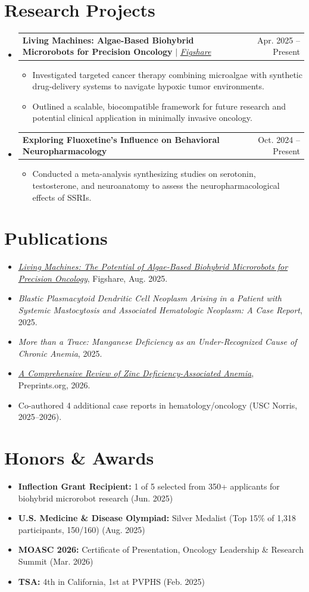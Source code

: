 \documentclass[letterpaper,11pt]{article}
\makeatletter
\newcommand{\resumeItem}[1]{
  \item\small{
    {#1 \vspace{-2pt}}
  }
}
\newcommand{\resumeProjectHeading}[2]{
    \item
    \begin{tabular*}{0.97\textwidth}{l@{\extracolsep{\fill}}r}
      \small#1 & #2 \\
    \end{tabular*}\vspace{-7pt}
}
\newcommand{\resumeSubHeadingListStart}{\begin{itemize}[leftmargin=0.15in, label={}]}
\newcommand{\resumeSubHeadingListEnd}{\end{itemize}}
\newcommand{\resumeItemListStart}{\begin{itemize}}
\newcommand{\resumeItemListEnd}{\end{itemize}\vspace{-5pt}}
\makeatother
\begin{document}
\section{Research Projects}
    \resumeSubHeadingListStart
      \resumeProjectHeading
          {\textbf{Living Machines: Algae-Based Biohybrid Microrobots for Precision Oncology} $|$ \emph{\href{https://figshare.com/articles/preprint/Living_Machines_Algae-Based_Biohybrid_Microrobots_for_Precision_Oncology/29896883}{\underline{Figshare}}}}{Apr. 2025 -- Present}
          \resumeItemListStart
            \resumeItem{Investigated targeted cancer therapy combining microalgae with synthetic drug-delivery systems to navigate hypoxic tumor environments.}
            \resumeItem{Outlined a scalable, biocompatible framework for future research and potential clinical application in minimally invasive oncology.}
          \resumeItemListEnd
      \resumeProjectHeading
          {\textbf{Exploring Fluoxetine's Influence on Behavioral Neuropharmacology}}{Oct. 2024 -- Present}
          \resumeItemListStart
            \resumeItem{Conducted a meta-analysis synthesizing studies on serotonin, testosterone, and neuroanatomy to assess the neuropharmacological effects of SSRIs.}
          \resumeItemListEnd
    \resumeSubHeadingListEnd

\section{Publications}
  \resumeSubHeadingListStart
  \resumeItemListStart
    \resumeItem{\textit{\href{https://figshare.com/articles/preprint/Living_Machines_Algae-Based_Biohybrid_Microrobots_for_Precision_Oncology/29896883}{\underline{Living Machines: The Potential of Algae-Based Biohybrid Microrobots for Precision Oncology}}}, Figshare, Aug. 2025.}
    \resumeItem{\textit{Blastic Plasmacytoid Dendritic Cell Neoplasm Arising in a Patient with Systemic Mastocytosis and Associated Hematologic Neoplasm: A Case Report}, 2025.}
    \resumeItem{\textit{More than a Trace: Manganese Deficiency as an Under-Recognized Cause of Chronic Anemia}, 2025.}
    \resumeItem{\textit{\href{https://www.preprints.org/manuscript/202606.0210}{\underline{A Comprehensive Review of Zinc Deficiency-Associated Anemia}}}, Preprints.org, 2026.}
    \resumeItem{Co-authored 4 additional case reports in hematology/oncology (USC Norris, 2025--2026).}
  \resumeItemListEnd
  \resumeSubHeadingListEnd

\section{Honors \& Awards}
  \resumeSubHeadingListStart
  \resumeItemListStart
    \resumeItem{\textbf{Inflection Grant Recipient:} 1 of 5 selected from 350+ applicants for biohybrid microrobot research (Jun. 2025)}
    \resumeItem{\textbf{U.S. Medicine \& Disease Olympiad:} Silver Medalist (Top 15\% of 1,318 participants, 150/160) (Aug. 2025)}
    \resumeItem{\textbf{MOASC 2026:} Certificate of Presentation, Oncology Leadership \& Research Summit (Mar. 2026)}
    \resumeItem{\textbf{TSA:} 4th in California, 1st at PVPHS (Feb. 2025)}
  \resumeItemListEnd
  \resumeSubHeadingListEnd
\end{document}
